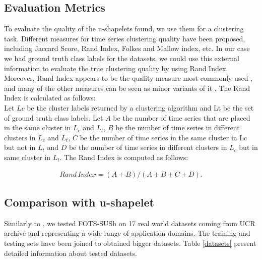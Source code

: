 \subsection{Evaluation Metrics}
To evaluate the quality of the u-shapelets found, we use them for a clustering task. Different measures for time series clustering quality have been proposed, including Jaccard Score, Rand Index, Folkes and Mallow index, etc. In our case we had ground truth class labels for the datasets, we could use this external information to evaluate the true clustering quality by using Rand Index. Moreover, Rand Index appears to be the quality measure  most commonly used   \cite{zakaria2012clustering} \cite{ulanova2015scalable} \cite{zhang2016unsupervised}, and many of the other measures can be seen as minor variants of it \cite{halkidi2001clustering}.
The Rand Index \cite{rand1971objective} is calculated as follows:
\\
Let $Lc$ be the cluster labels returned by a clustering algorithm and Lt be the
set of ground truth class labels. Let $A$ be the number of time series that are
placed in the same cluster in $L_c$ and $L_t$, $B$ be the number of time series in
different clusters in $L_c$ and $L_t$, $C$ be the number of time series in the same
cluster in Lc but not in $L_t$ and $D$ be the number of time series in different
clusters in $L_c$ but in same cluster in $L_t$. The Rand Index is computed as follows:  

\begin{eqnarray}
Rand\,Index = (A+B)/(A+B+C+D).
\end{eqnarray}    

\subsection{Comparison with u-shapelet}
Similarly to \cite{dallachiesa}, we tested FOTS-SUSh on 17 real world datasets coming from UCR archive \cite{UCRArchive} and representing a wide range of application domains. The training and testing sets have been joined to obtained bigger datasets. Table \ref{datasets} present detailed information about tested datasets.




